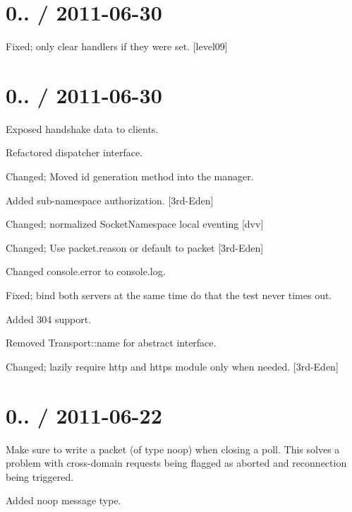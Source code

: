 \section*{0.. / 2011-\/06-\/30 }


\begin{DoxyItemize}
\item Fixed; only clear handlers if they were set. \mbox{[}level09\mbox{]}
\end{DoxyItemize}

\section*{0.. / 2011-\/06-\/30 }


\begin{DoxyItemize}
\item Exposed handshake data to clients.
\item Refactored dispatcher interface.
\item Changed; Moved id generation method into the manager.
\item Added sub-\/namespace authorization. \mbox{[}3rd-\/\+Eden\mbox{]}
\item Changed; normalized Socket\+Namespace local eventing \mbox{[}dvv\mbox{]}
\item Changed; Use packet.\+reason or default to \textquotesingle{}packet\textquotesingle{} \mbox{[}3rd-\/\+Eden\mbox{]}
\item Changed console.\+error to console.\+log.
\item Fixed; bind both servers at the same time do that the test never times out.
\item Added 304 support.
\item Removed {\ttfamily Transport\+::name} for abstract interface.
\item Changed; lazily require http and https module only when needed. \mbox{[}3rd-\/\+Eden\mbox{]}
\end{DoxyItemize}

\section*{0.. / 2011-\/06-\/22 }


\begin{DoxyItemize}
\item Make sure to write a packet (of type {\ttfamily noop}) when closing a poll. This solves a problem with cross-\/domain requests being flagged as aborted and reconnection being triggered.
\item Added {\ttfamily noop} message type.
\end{DoxyItemize}

